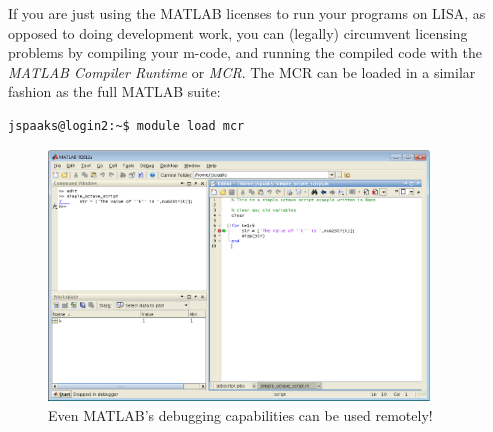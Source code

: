 If you are just using the MATLAB licenses to run your programs on LISA, as opposed to doing development work, you can (legally) circumvent licensing problems by compiling your m-code, and running the compiled code with the \textit{MATLAB Compiler Runtime} or \textit{MCR}. The MCR can be loaded in a similar fashion as the full MATLAB suite:
\begin{lstlisting}[style=basic,style=bash]
jspaaks@login2:~$ module load mcr
\end{lstlisting}

\begin{figure}[!htb]
  \centering
    \includegraphics[width=0.9\textwidth]{./../eps/matlab-remote-debugging.eps}
  \caption{Even MATLAB's debugging capabilities can be used remotely!}
  \label{fig:matlab-remote-debugging}
\end{figure}


